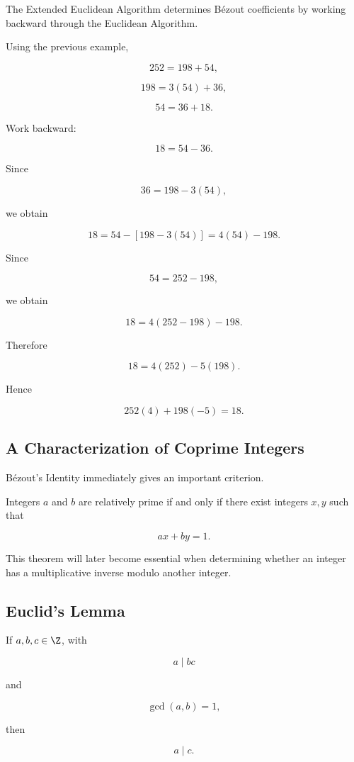 The Extended Euclidean Algorithm determines Bézout coefficients by working
backward through the Euclidean Algorithm.

Using the previous example,

\[ 252=198+54, \]

\[ 198=3(54)+36, \]

\[ 54=36+18. \]

Work backward:

\[ 18=54-36. \]

Since

\[ 36=198-3(54), \]

we obtain

\[ 18=54-[198-3(54)]=4(54)-198. \]

Since

\[ 54=252-198, \]

we obtain

\[ 18=4(252-198)-198. \]

Therefore

\[ 18=4(252)-5(198). \]

Hence

\[ \boxed{252(4)+198(-5)=18.} \]

\subsection{A Characterization of Coprime Integers}
\label{subsec:coprime-bezout}

Bézout's Identity immediately gives an important criterion.

\begin{theorem}
Integers \(a\) and \(b\) are relatively prime if and only if there exist
integers \(x,y\) such that

\[ ax+by=1. \]
\end{theorem}

This theorem will later become essential when determining whether an integer
has a multiplicative inverse modulo another integer.

\subsection{Euclid's Lemma}
\label{subsec:euclids-lemma}

\begin{theorem}
If \(a,b,c\in\Z\), with

\[ a\mid bc \]

and

\[ \gcd(a,b)=1, \]

then

\[ a\mid c. \]
\end{theorem}

